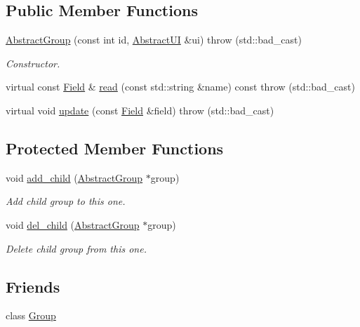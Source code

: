 \subsection*{Public Member Functions}
\begin{DoxyCompactItemize}
\item 
\hyperlink{classCore_1_1AbstractGroup_a413d72742d0f92f44615dba99e3430fd}{AbstractGroup} (const int id, \hyperlink{classCore_1_1AbstractUI}{AbstractUI} \&ui)  throw (std::bad\_\-cast)
\begin{DoxyCompactList}\small\item\em Constructor. \item\end{DoxyCompactList}\item 
virtual const \hyperlink{classCore_1_1Field}{Field} \& \hyperlink{classCore_1_1AbstractGroup_afd7a53d0bc49a5dbdc15505a686fca3d}{read} (const std::string \&name) const   throw (std::bad\_\-cast)
\item 
virtual void \hyperlink{classCore_1_1AbstractGroup_a397f639a0ee32efbc5a3ead8002745d5}{update} (const \hyperlink{classCore_1_1Field}{Field} \&field)  throw (std::bad\_\-cast)
\end{DoxyCompactItemize}
\subsection*{Protected Member Functions}
\begin{DoxyCompactItemize}
\item 
void \hyperlink{classCore_1_1AbstractGroup_aef90e91087aa5fcf4a94f0f2677f8f56}{add\_\-child} (\hyperlink{classCore_1_1AbstractGroup}{AbstractGroup} $\ast$group)
\begin{DoxyCompactList}\small\item\em Add child group to this one. \item\end{DoxyCompactList}\item 
void \hyperlink{classCore_1_1AbstractGroup_aa81866b9c414c24d25ca26311b4b4330}{del\_\-child} (\hyperlink{classCore_1_1AbstractGroup}{AbstractGroup} $\ast$group)
\begin{DoxyCompactList}\small\item\em Delete child group from this one. \item\end{DoxyCompactList}\end{DoxyCompactItemize}
\subsection*{Friends}
\begin{DoxyCompactItemize}
\item 
class \hyperlink{classCore_1_1AbstractGroup_a2697825715974a353728f0d4d5658112}{Group}
\end{DoxyCompactItemize}


